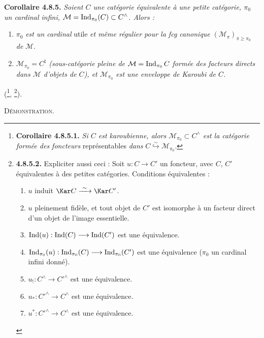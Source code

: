 \textbf{Corollaire 4.8.5.} \textit{Soient $C$ une catégorie équivalente à une petite catégorie, $\pi_0$ un cardinal infini, $\mathcal{M}=\operatorname{Ind}_{\pi_0}(C)\subset C^\wedge$. Alors :}
\begin{enumerate}
\item[\textit{1$^\circ$)}] $\pi_0$ \textit{est un cardinal} utile \textit{et même régulier pour la fcg canonique} $(\mathcal{M}_\pi)_{\pi\geqslant\pi_0}$ \textit{de} $\mathcal{M}$.
\item[\textit{2$^\circ$)}] $\mathcal{M}_{\pi_0}=C^\natural$ \textit{(sous-catégorie pleine de $\mathcal{M}=\operatorname{Ind}_{\pi_0}C$ formée des facteurs directs dans $\mathcal{M}$ d'objets de $C$), et $\mathcal{M}_{\pi_0}$ est une enveloppe de Karoubi de $C$.}
\end{enumerate}
(\footnote{\textbf{Corollaire 4.8.5.1.} \textit{Si $C$ est karoubienne, alors $\mathcal{M}_{\pi_0}\subset C^\wedge$ est la catégorie formée des foncteurs} représentables \textit{dans} $C\overset{\sim}{\hookrightarrow}\mathcal{M}_{\pi_0}$.}, \footnote{\textbf{4.8.5.2.} Expliciter aussi ceci : Soit $u : C\longrightarrow C'$ un foncteur, avec $C$, $C'$ équivalentes à des petites catégories. Conditions équivalentes :
\begin{enumerate}
\item[a)] $u$ induit $\Kar C\xrightarrow{\ \sim\ }\Kar C'$.
\item[a$'$)] $u$ pleinement fidèle, et tout objet de $C'$ est isomorphe à un facteur direct d'un objet de l'image essentielle.
\item[b)] $\operatorname{Ind}(u) : \operatorname{Ind}(C)\longrightarrow\operatorname{Ind}(C')$ est une équivalence.
\item[c)] $\operatorname{Ind}_{\pi_0}(u) : \operatorname{Ind}_{\pi_0}(C)\longrightarrow\operatorname{Ind}_{\pi_0}(C')$ est une équivalence ($\pi_0$ un cardinal infini donné).
\item[d)] $u_! : C^\wedge\longrightarrow C'^\wedge$ est une équivalence.
\item[d$'$)] $u_* : C'^\wedge\longrightarrow C^\wedge$ est une équivalence.
\item[d$''$)] $u^* : C'^\wedge\longrightarrow C^\wedge$ est une équivalence.
\end{enumerate}}).


\textsc{Démonstration.}

